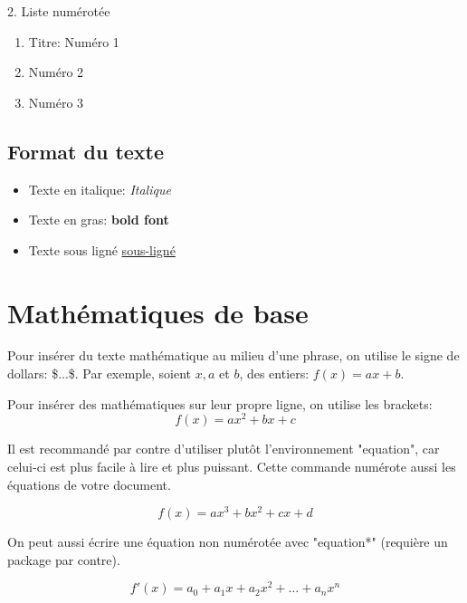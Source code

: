 \documentclass[letterpaper, french, 12pt]{article} %
\numberwithin{equation}{section}
\numberwithin{figure}{section}
\begin{document}
2. Liste numérotée
\begin{enumerate}
    \item Titre: Numéro 1
    \item Numéro 2
    \item Numéro 3
\end{enumerate}

\subsection{Format du texte}
\begin{itemize}
    \item Texte en italique: \textit{Italique}
    \item Texte en gras: \textbf{bold font}
    \item Texte sous ligné \underline{sous-ligné}
\end{itemize}

\section{Mathématiques de base}
Pour insérer du texte mathématique au milieu
d'une phrase, on utilise le signe de dollars:
\$...\$. Par exemple, soient $x, a$ et $b$, des entiers: $f(x) = ax + b$.

Pour insérer des mathématiques sur leur propre ligne, on utilise les brackets:
\[
f(x) = ax^2 + bx + c
\]

Il est recommandé par contre d'utiliser plutôt l'environnement "equation", car celui-ci est plus facile à lire et plus puissant. Cette commande numérote aussi les équations de votre document.

\begin{equation}
    f(x) = ax^3 + bx^2 + cx + d
\end{equation}

On peut aussi écrire une équation non numérotée avec "equation*" (requière un package par contre).

\begin{equation*}
    f'(x) = a_0 + a_1x + a_2x^2 + \dots + a_nx^n
\end{equation*}
\end{document}
